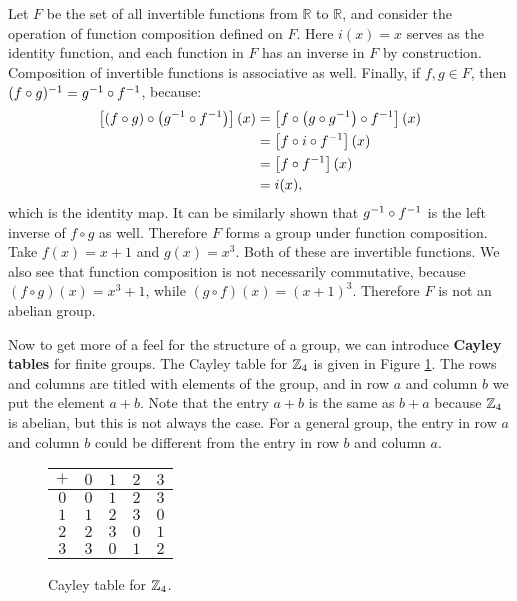 \begin{example}
Let $F$ be the set of all invertible functions from $\mathbb{R}$ to $\mathbb{R}$, and consider the operation of function composition defined on $F$. Here $i(x) = x$ serves as the identity function, and each function in $F$ has an inverse in $F$ by construction. Composition of invertible functions is associative as well. Finally, if $f, g \in F$, then $\inv{(f \circ g)} = \inv g \circ \inv f$, because: 
\begin{align*}
\left[(f \circ g) \circ \left(\inv g \circ \inv f\right) \right](x) &= \left[f \circ \left(g \circ \inv g\right) \circ \inv f \right](x) \\
&= \left[f \circ i \circ \inv f\right](x) \\
&= \left[f \circ \inv f\right](x) \\
&= i(x)\mathrm{,}
\end{align*}
which is the identity map. It can be similarly shown that $\inv g \circ \inv f$ is the left inverse of $f \circ g$ as well. Therefore $F$ forms a group under function composition. Take $f(x) = x+1$ and $g(x) = x^3$. Both of these are invertible functions. We also see that function composition is not necessarily commutative, because $(f \circ g)(x) = x^3 + 1$, while $(g \circ f)(x) = (x+1)^3$. Therefore $F$ is not an abelian group.
\end{example}

Now \extra to get more of a feel for the structure of a group, we can introduce \textbf{Cayley tables} for finite groups. The Cayley table for $\zn[4]$ is given in Figure \ref{z4}. The rows and columns are titled with elements of the group, and in row $a$ and column $b$ we put the element $a + b$. Note that the entry $a + b$ is the same as $b + a$ because $\zn[4]$ is abelian, but this is not always the case. For a general group, the entry in row $a$ and column $b$ could be different from the entry in row $b$ and column $a$.

\begin{figure}[ht]
\centering
\begin{tabular}{c | c c c c}
    $+$ & $0$ & $1$ & $2$ & $3$ \\
    \hline
    $0$ & $0$ & $1$ & $2$ & $3$ \\
    $1$ & $1$ & $2$ & $3$ & $0$ \\
    $2$ & $2$ & $3$ & $0$ & $1$ \\
    $3$ & $3$ & $0$ & $1$ & $2$
\end{tabular}
\caption{Cayley table for $\zn[4]$.}
\label{z4}
\end{figure}

